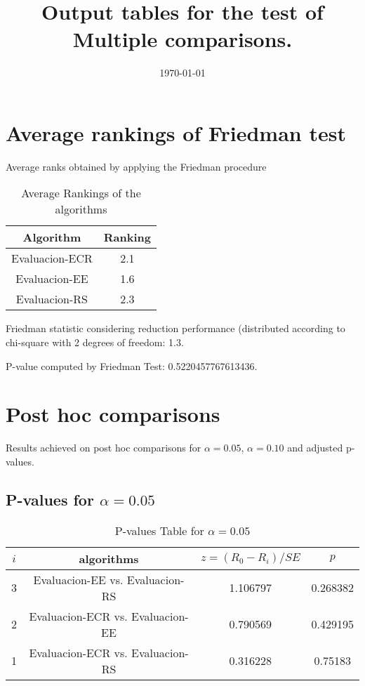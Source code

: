 \documentclass[a4paper,10pt]{article}
\title{Output tables for the test of Multiple comparisons.}
\author{}
\date{\today}
\begin{document}
\begin{landscape}
\pagestyle{empty}
\maketitle
\thispagestyle{empty}
\section{Average rankings of Friedman test}



Average ranks obtained by applying the Friedman procedure

\begin{table}[!htp]
\centering
\begin{tabular}{|c|c|}\hline
Algorithm&Ranking\\\hline
Evaluacion-ECR & 2.1\\
Evaluacion-EE & 1.6\\
Evaluacion-RS & 2.3\\
\hline
\end{tabular}
\caption{Average Rankings of the algorithms}
\end{table}

Friedman statistic considering reduction performance (distributed according to chi-square with 2 degrees of freedom: 1.3.

P-value computed by Friedman Test: 0.5220457767613436.\newline



\pagebreak

\section{Post hoc comparisons}

Results achieved on post hoc comparisons for $\alpha = 0.05$, $\alpha = 0.10$ and adjusted p-values.

\subsection{P-values for $\alpha=0.05$}

\begin{table}[!htp]
\centering\scriptsize
\begin{tabular}{cccc}
$i$&algorithms&$z=(R_0 - R_i)/SE$&$p$\\
\hline3&Evaluacion-EE vs. Evaluacion-RS&1.106797&0.268382\\
2&Evaluacion-ECR vs. Evaluacion-EE&0.790569&0.429195\\
1&Evaluacion-ECR vs. Evaluacion-RS&0.316228&0.75183\\
\hline
\end{tabular}
\caption{P-values Table for $\alpha=0.05$}
\end{table}\pagebreak


\end{landscape}
\end{document}
